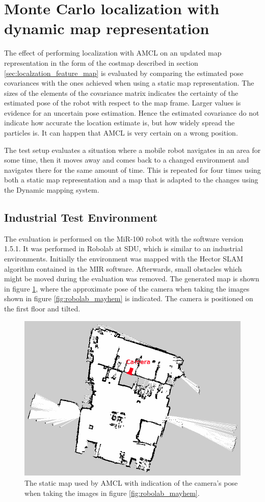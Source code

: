 \section{Monte Carlo localization with dynamic map representation}
\label{sec:amcl_dyn_map}
The effect of performing localization with AMCL on an updated map representation in the form of the costmap described in section \ref{sec:localzation_feature_map} is evaluated by comparing the estimated pose covariances with the ones achieved when using a static map representation. 
The sizes of the elements of the covariance matrix indicates the certainty of the estimated pose of the robot with respect to the map frame. 
Larger values is evidence for an uncertain pose estimation. Hence the estimated covariance do not indicate how accurate the location estimate is, but how widely spread the particles is. 
It can happen that AMCL is very certain on a wrong position. 

The test setup evaluates a situation where a mobile robot navigates in an area for some time, then it moves away and comes back to a changed environment and navigates there for the same amount of time. 
This is repeated for four times using both a static map representation and a map that is adapted to the changes using the Dynamic mapping system. 

\subsection{Industrial Test Environment}
The evaluation is performed on the MiR-100 robot with the software version 1.5.1. It was performed in Robolab at SDU, which is similar to an industrial environments. Initially the environment was mapped with the Hector SLAM algorithm contained in the MIR software. 
Afterwards, small obstacles which might be moved during the evaluation was removed.
The generated map is shown in figure \ref{fig:Robolab1_clean_with_cam}, where the approximate pose of the camera when taking the images shown in figure \ref{fig:robolab_mayhem} is indicated. 
The camera is positioned on the first floor and tilted.

\begin{figure}[tbph]
	\centering
	\includegraphics[width=0.7\linewidth]{chapters/evaluation/figures/Robolab1_clean_with_cam}
	\caption{The static map used by AMCL with indication of the camera's pose when taking the images in figure \ref{fig:robolab_mayhem}.}
	\label{fig:Robolab1_clean_with_cam}
\end{figure}

